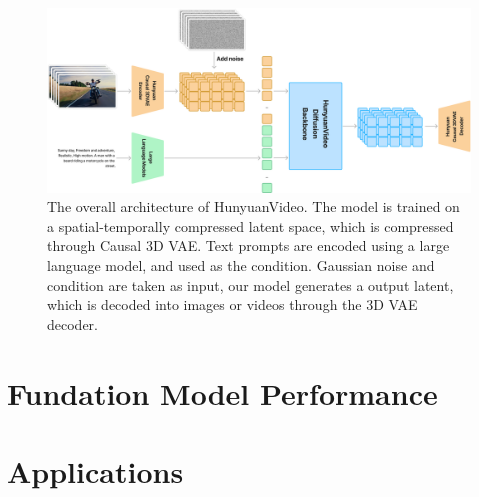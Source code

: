 \documentclass{article}
\newcommand{\nameofmethod}{HunyuanVideo}
\newcommand{\dq}[1]{\textcolor{cyan}{\bf\small [Daquan: #1]}}
\begin{document}
\label{sec:model_arch}
\begin{figure}[t]
    \centering
    \includegraphics[width=0.95\linewidth]{figures/hunyuanvideo_overview.png}

    \caption{The overall architecture of \nameofmethod{}. The model is trained on a spatial-temporally compressed latent space, which is compressed through Causal 3D VAE. Text prompts are encoded using a large language model, and used as the condition. Gaussian noise and condition are taken as input, our model generates a output latent, which is decoded into images or videos through the 3D VAE decoder.}
    \label{fig:hunyuanvideo_overview}
\end{figure}







% 





\section{Fundation Model Performance}
\label{sec:exp}







\section{Applications}
\label{sec:application}







\end{document}
